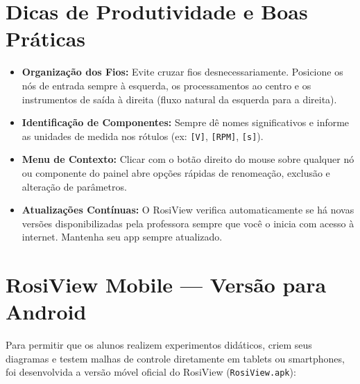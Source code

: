 \documentclass[11pt,a4paper]{article}
\begin{document}
\section{Dicas de Produtividade e Boas Práticas}

\begin{itemize}[leftmargin=*]
    \item \textbf{Organização dos Fios:} Evite cruzar fios desnecessariamente. Posicione os nós de entrada sempre à esquerda, os processamentos ao centro e os instrumentos de saída à direita (fluxo natural da esquerda para a direita).
    \item \textbf{Identificação de Componentes:} Sempre dê nomes significativos e informe as unidades de medida nos rótulos (ex: \texttt{[V]}, \texttt{[RPM]}, \texttt{[s]}).
    \item \textbf{Menu de Contexto:} Clicar com o botão direito do mouse sobre qualquer nó ou componente do painel abre opções rápidas de renomeação, exclusão e alteração de parâmetros.
    \item \textbf{Atualizações Contínuas:} O RosiView verifica automaticamente se há novas versões disponibilizadas pela professora sempre que você o inicia com acesso à internet. Mantenha seu app sempre atualizado.
\end{itemize}

\section{RosiView Mobile --- Versão para Android}

Para permitir que os alunos realizem experimentos didáticos, criem seus diagramas e testem malhas de controle diretamente em tablets ou smartphones, foi desenvolvida a versão móvel oficial do RosiView (\texttt{RosiView.apk}):
\end{document}
